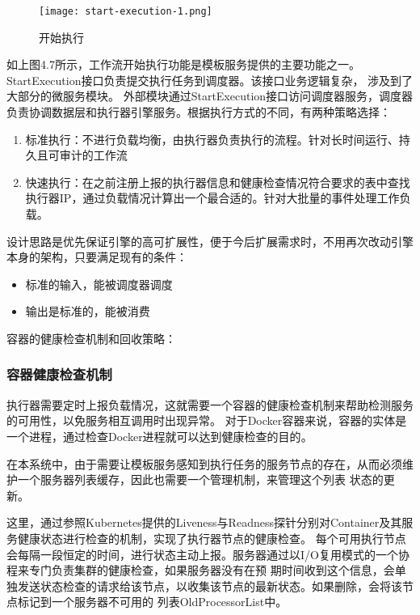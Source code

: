 \begin{figure}[H]
\centering
\texttt{[image: start-execution-1.png]}
\caption{开始执行}
\label{fig:kszx}
\end{figure}

如上图4.7所示，工作流开始执行功能是模板服务提供的主要功能之一。StartExecution接口负责提交执行任务到调度器。该接口业务逻辑复杂，
涉及到了大部分的微服务模块。 外部模块通过StartExecution接口访问调度器服务，调度器负责协调数据层和执行器引擎服务。根据执行方式的不同，有两种策略选择：

\begin{enumerate}
    \item 标准执行：不进行负载均衡，由执行器负责执行的流程。针对长时间运行、持久且可审计的工作流
    \item 快速执行：在之前注册上报的执行器信息和健康检查情况符合要求的表中查找执行器IP，通过负载情况计算出一个最合适的。针对大批量的事件处理工作负载。
\end{enumerate}


设计思路是优先保证引擎的高可扩展性，便于今后扩展需求时，不用再次改动引擎本身的架构，只要满足现有的条件：
\begin{itemize}
    \item 标准的输入，能被调度器调度
    \item 输出是标准的，能被消费
\end{itemize}

容器的健康检查机制和回收策略：
\subsubsection{容器健康检查机制}

执行器需要定时上报负载情况，这就需要一个容器的健康检查机制来帮助检测服务的可用性，以免服务相互调用时出现异常。
对于Docker容器来说，容器的实体是一个进程，通过检查Docker进程就可以达到健康检查的目的\cite{zw1}。

在本系统中，由于需要让模板服务感知到执行任务的服务节点的存在，从而必须维护一个服务器列表缓存，因此也需要一个管理机制，来管理这个列表
状态的更新。

这里，通过参照Kubernetes提供的Liveness与Readness探针分别对Container及其服务健康状态进行检查的机制\cite{wfwr442}，实现了执行器节点的健康检查。
每个可用执行节点会每隔一段恒定的时间，进行状态主动上报。服务器通过以I/O复用模式的一个协程来专门负责集群的健康检查，如果服务器没有在预
期时间收到这个信息，会单独发送状态检查的请求给该节点，以收集该节点的最新状态。如果删除，会将该节点标记到一个服务器不可用的
列表OldProcessorList中\cite{zw2}。

